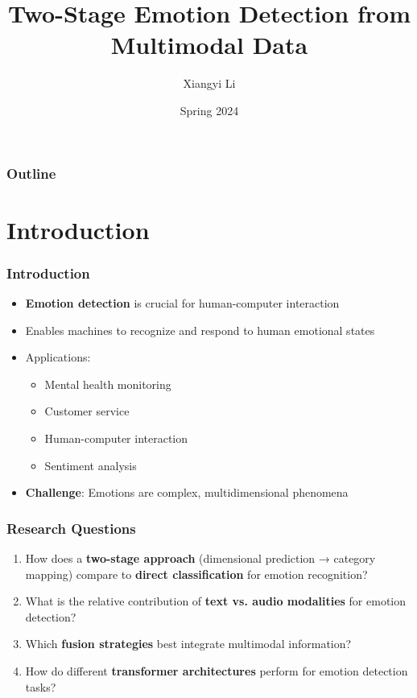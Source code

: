 \documentclass{beamer}
\title{Two-Stage Emotion Detection from Multimodal Data}
\author{Xiangyi Li}
\institute{San José State University\\Department of Computer Science}
\date{Spring 2024}
\begin{document}
\begin{frame}
\titlepage
\end{frame}

\begin{frame}
\frametitle{Outline}
\tableofcontents
\end{frame}

\section{Introduction}

\begin{frame}
\frametitle{Introduction}
\begin{itemize}
    \item \textbf{Emotion detection} is crucial for human-computer interaction
    \item Enables machines to recognize and respond to human emotional states
    \item Applications:
    \begin{itemize}
        \item Mental health monitoring
        \item Customer service
        \item Human-computer interaction
        \item Sentiment analysis
    \end{itemize}
    \item \textbf{Challenge}: Emotions are complex, multidimensional phenomena
\end{itemize}
\end{frame}

\begin{frame}
\frametitle{Research Questions}
\begin{enumerate}
    \item How does a \textbf{two-stage approach} (dimensional prediction → category mapping) compare to \textbf{direct classification} for emotion recognition?
    \item What is the relative contribution of \textbf{text vs. audio modalities} for emotion detection?
    \item Which \textbf{fusion strategies} best integrate multimodal information?
    \item How do different \textbf{transformer architectures} perform for emotion detection tasks?
\end{enumerate}
\end{frame}
\end{document}
